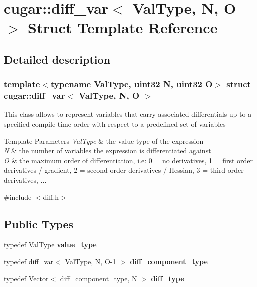 \hypertarget{structcugar_1_1diff__var}{}\section{cugar\+:\+:diff\+\_\+var$<$ Val\+Type, N, O $>$ Struct Template Reference}
\label{structcugar_1_1diff__var}


\subsection{Detailed description}
\subsubsection*{template$<$typename Val\+Type, uint32 N, uint32 O$>$\newline
struct cugar\+::diff\+\_\+var$<$ Val\+Type, N, O $>$}

This class allows to represent variables that carry associated differentials up to a specified compile-\/time order with respect to a predefined set of variables


\begin{DoxyTemplParams}{Template Parameters}
{\em Val\+Type} & the value type of the expression \\
\hline
{\em N} & the number of variables the expression is differentiated against \\
\hline
{\em O} & the maximum order of differentiation, i.\+e\+: 0 = no derivatives, 1 = first order derivatives / gradient, 2 = second-\/order derivatives / Hessian, 3 = third-\/order derivatives, ... \\
\hline
\end{DoxyTemplParams}


{\ttfamily \#include $<$diff.\+h$>$}

\subsection*{Public Types}
\begin{DoxyCompactItemize}
\item 
\mbox{\label{structcugar_1_1diff__var_a67c8868ae47924ac0730b47342ce118f}} 
typedef Val\+Type {\bfseries value\+\_\+type}
\item 
\mbox{\label{structcugar_1_1diff__var_aea9b40098586d8c221a335f7e42c9b3c}} 
typedef \hyperlink{structcugar_1_1diff__var}{diff\+\_\+var}$<$ Val\+Type, N, O-\/1 $>$ {\bfseries diff\+\_\+component\+\_\+type}
\item 
\mbox{\label{structcugar_1_1diff__var_aa4fb144eb95b619784581466b0804b0f}} 
typedef \hyperlink{structcugar_1_1_vector}{Vector}$<$ \hyperlink{structcugar_1_1diff__var}{diff\+\_\+component\+\_\+type}, N $>$ {\bfseries diff\+\_\+type}
\end{DoxyCompactItemize}
